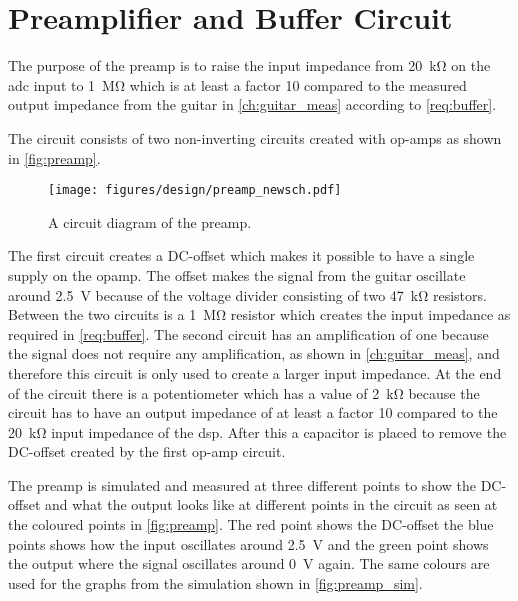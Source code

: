 \section{Preamplifier and Buffer Circuit}
\label{sec:preamp}

The purpose of the \gls{preamp} is to raise the input impedance from \SI{20}{\kilo\ohm} on the \gls{adc} input to \SI{1}{\mega\ohm} which is at least a factor 10 compared to the measured output impedance from the guitar in \autoref{ch:guitar_meas} according to \autoref{req:buffer}. 

The circuit consists of two non-inverting circuits created with op-amps as shown in \autoref{fig:preamp}. 

\begin{figure}[htbp]
	\centering
	\texttt{[image: figures/design/preamp\_newsch.pdf]}
	\caption{A circuit diagram of the \gls{preamp}.}
	\label{fig:preamp}
\end{figure}


The first circuit creates a DC-offset which makes it possible to have a single supply on the \gls{opamp}. The offset makes the signal from the guitar oscillate around \SI{2.5}{\volt} because of the voltage divider consisting of two \SI{47}{\kilo\ohm} resistors. Between the two circuits is a \SI{1}{\mega\ohm} resistor which creates the input impedance as required in \autoref{req:buffer}. The second circuit has an amplification of one because the signal does not require any amplification, as shown in \autoref{ch:guitar_meas}, and therefore this circuit is only used to create a larger input impedance. At the end of the circuit there is a potentiometer which has a value of \SI{2}{\kilo\ohm} because the circuit has to have an output impedance of at least a factor 10 compared to the \SI{20}{\kilo\ohm} input impedance of the \gls{dsp}. After this a capacitor is placed to remove the DC-offset created by the first op-amp circuit.  

The \gls{preamp} is simulated and measured at three different points to show the DC-offset and what the output looks like at different points in the circuit as seen at the coloured points in \autoref{fig:preamp}. The red point shows the DC-offset the blue points shows how the input oscillates around \SI{2.5}{\volt} and the green point shows the output where the signal oscillates around \SI{0}{\volt} again. The same colours are used for the graphs from the simulation shown in \autoref{fig:preamp_sim}. 
 
